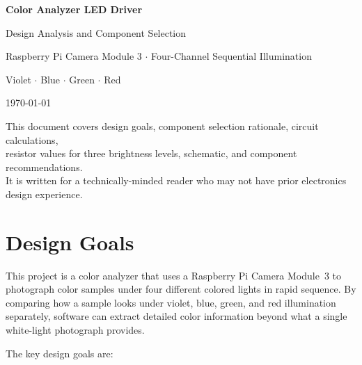 \documentclass[12pt,letterpaper]{article}
\begin{document}
\begin{titlepage}
  \centering
  \vspace*{2cm}
  {\Huge\bfseries\color{headblue} Color Analyzer LED Driver\par}
  \vspace{0.5cm}
  {\Large Design Analysis and Component Selection\par}
  \vspace{2cm}
  {\large Raspberry Pi Camera Module 3 $\cdot$ Four-Channel Sequential Illumination\par}
  \vspace{0.5cm}
  {\large Violet $\cdot$ Blue $\cdot$ Green $\cdot$ Red\par}
  \vspace{3cm}
  {\normalsize\today\par}
  \vfill
  {\small This document covers design goals, component selection rationale, circuit calculations,\\
  resistor values for three brightness levels, schematic, and component recommendations.\\
  It is written for a technically-minded reader who may not have prior electronics design experience.}
\end{titlepage}

\tableofcontents
\newpage

\section{Design Goals}

This project is a color analyzer that uses a Raspberry Pi Camera Module~3 to photograph
color samples under four different colored lights in rapid sequence. By comparing how a
sample looks under violet, blue, green, and red illumination separately, software can
extract detailed color information beyond what a single white-light photograph provides.

The key design goals are:
\end{document}
